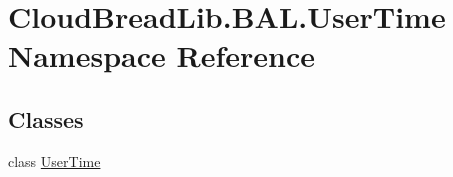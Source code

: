 \hypertarget{namespace_cloud_bread_lib_1_1_b_a_l_1_1_user_time}{}\section{Cloud\+Bread\+Lib.\+B\+A\+L.\+User\+Time Namespace Reference}
\label{namespace_cloud_bread_lib_1_1_b_a_l_1_1_user_time}
\subsection*{Classes}
\begin{DoxyCompactItemize}
\item 
class \hyperlink{class_cloud_bread_lib_1_1_b_a_l_1_1_user_time_1_1_user_time}{User\+Time}
\end{DoxyCompactItemize}
